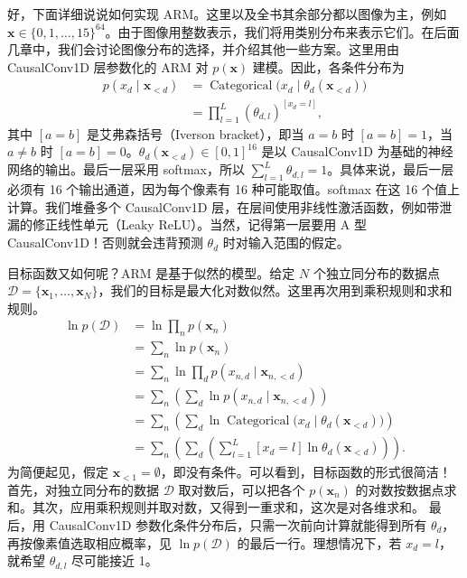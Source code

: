 好，下面详细说说如何实现 ARM。这里以及全书其余部分都以图像为主，例如 $\mathbf{x}\in\{0,1,\ldots,15\}^{64}$。由于图像用整数表示，我们将用类别分布来表示它们。在后面几章中，我们会讨论图像分布的选择，并介绍其他一些方案。这里用由 CausalConv1D 层参数化的 ARM 对 $p(\mathbf{x})$ 建模。因此，各条件分布为
\begin{align}
p(x_d\mid\mathbf{x}_{<d})&=\operatorname{Categorical}\bigl(x_d\mid\theta_d(\mathbf{x}_{<d})\bigr)
\tag{3.7}\label{eq:03-07}\\
&=\prod_{l=1}^L(\theta_{d,l})^{[x_d=l]},
\tag{3.8}\label{eq:03-08}
\end{align}
其中 $[a=b]$ 是艾弗森括号（Iverson bracket），即当 $a=b$ 时 $[a=b]=1$，当 $a\ne b$ 时 $[a=b]=0$。$\theta_d(\mathbf{x}_{<d})\in[0,1]^{16}$ 是以 CausalConv1D 为基础的神经网络的输出。最后一层采用 softmax，所以 $\sum_{l=1}^L\theta_{d,l}=1$。具体来说，最后一层必须有 16 个输出通道，因为每个像素有 16 种可能取值。softmax 在这 16 个值上计算。我们堆叠多个 CausalConv1D 层，在层间使用非线性激活函数，例如带泄漏的修正线性单元（Leaky ReLU）。当然，记得第一层要用 A 型 CausalConv1D！否则就会违背预测 $\theta_d$ 时对输入范围的假定。

目标函数又如何呢？ARM 是基于似然的模型。给定 $N$ 个独立同分布的数据点 $\mathcal{D}=\{\mathbf{x}_1,\ldots,\mathbf{x}_N\}$，我们的目标是最大化对数似然。这里再次用到乘积规则和求和规则。
\begin{align}
\ln p(\mathcal{D})
&=\ln\prod_n p(\mathbf{x}_n)
\tag{3.9}\label{eq:03-09}\\
&=\sum_n\ln p(\mathbf{x}_n)
\tag{3.10}\label{eq:03-10}\\
&=\sum_n\ln\prod_d p(x_{n,d}\mid\mathbf{x}_{n,<d})
\tag{3.11}\label{eq:03-11}\\
&=\sum_n\left(\sum_d\ln p(x_{n,d}\mid\mathbf{x}_{n,<d})\right)
\tag{3.12}\label{eq:03-12}\\
&=\sum_n\left(\sum_d\ln\operatorname{Categorical}\bigl(x_d\mid\theta_d(\mathbf{x}_{<d})\bigr)\right)
\tag{3.13}\label{eq:03-13}\\
&=\sum_n\left(\sum_d\left(\sum_{l=1}^L[x_d=l]\ln\theta_d(\mathbf{x}_{<d})\right)\right).
\tag{3.14}\label{eq:03-14}
\end{align}
为简便起见，假定 $\mathbf{x}_{<1}=\emptyset$，即没有条件。可以看到，目标函数的形式很简洁！首先，对独立同分布的数据 $\mathcal{D}$ 取对数后，可以把各个 $p(\mathbf{x}_n)$ 的对数按数据点求和。其次，应用乘积规则并取对数，又得到一重求和，这次是对各维求和。
最后，用 CausalConv1D 参数化条件分布后，只需一次前向计算就能得到所有 $\theta_d$，再按像素值选取相应概率，见 $\ln p(\mathcal{D})$ 的最后一行。理想情况下，若 $x_d=l$，就希望 $\theta_{d,l}$ 尽可能接近 1。

